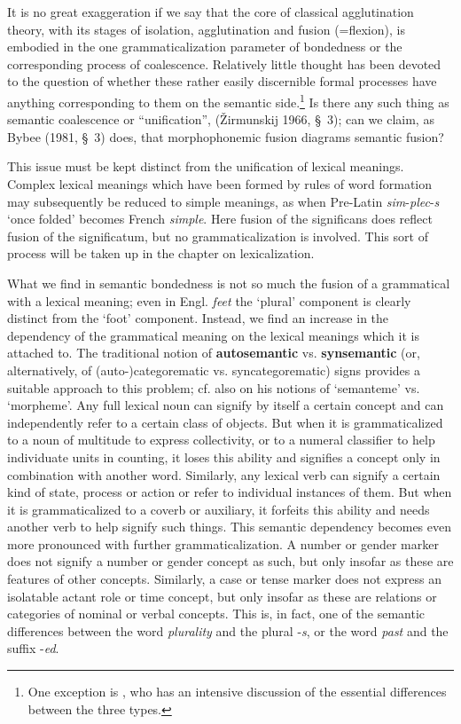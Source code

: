 It is no great exaggeration if we say that the core of classical agglutination theory, with its stages of isolation, agglutination and fusion (=flexion), is embodied in the one grammaticalization parameter of bondedness or the corresponding process of coalescence. Relatively little thought has been devoted to the question of whether these rather easily discernible formal processes have anything corresponding to them on the semantic side.\footnote{One exception is \citet[488-500]{Humboldt1836}, who has an  intensive discussion of the essential differences between the three types.} Is there any such thing as semantic coalescence or “unification”, (Žirmunskij 1966, §~3); can we claim, as Bybee (1981, §~3) does, that morphophonemic fusion diagrams semantic fusion?

This issue must be kept distinct from the unification of lexical meanings. Complex lexical meanings which have been formed by rules of word formation may subsequently be reduced to simple meanings, as when Pre-Latin \textit{sim}{}-\textit{plec}{}-\textit{s} ‘once folded’ becomes French \textit{simple}. Here fusion of the significans does reflect fusion of the significatum, but no grammaticalization is involved. This sort of process will be taken up in the chapter on lexicalization.

What we find in semantic bondedness is not so much the fusion of a grammatical with a lexical meaning; even in Engl. \textit{feet} the ‘plural’ component is clearly distinct from the ‘foot’ component. Instead, we find an increase in the dependency of the grammatical meaning on the lexical meanings which it is attached to. The traditional notion of \textbf{autosemantic} vs. \textbf{synsemantic} (or, alternatively, of (auto-)categorematic vs. syncategorematic) signs provides a suitable approach to this problem; cf. also \citet[230 ]{Hjelmslev1928} on his notions of ‘semanteme’ vs. ‘morpheme’. Any full lexical noun can signify by itself a certain concept and can independently refer to a certain class of objects. But when it is grammaticalized to a noun of multitude to express collectivity, or to a numeral classifier to help individuate units in counting, it loses this ability and signifies a concept only in combination with another word. Similarly, any lexical verb can signify a certain kind of state, process or action or refer to individual instances of them. But when it is grammaticalized to a coverb or auxiliary, it forfeits this ability and needs another verb to help signify such things. This semantic dependency becomes even more pronounced with further grammaticalization. A number or gender marker does not signify a number or gender concept as such, but only insofar as these are features of other concepts. Similarly, a case or tense marker does not express an isolatable actant role or time concept, but only insofar as these are relations or categories of nominal or verbal concepts. This is, in fact, one of the semantic differences between the word \textit{plurality} and the plural -\textit{s}, or the word \textit{past} and the suffix -\textit{ed}.

